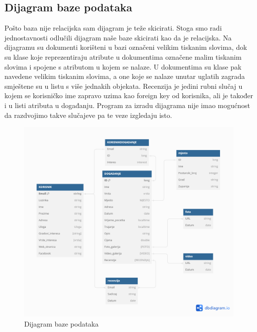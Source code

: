 			\subsection{Dijagram baze podataka}
				Pošto baza nije relacijska sam dijagram je teže skicirati. Stoga smo radi jednostavnosti odlučili dijagram naše baze skicirati kao da je relacijska. Na dijagramu su dokumenti korišteni u bazi označeni velikim tiskanim slovima, dok su klase koje reprezentiraju atribute u dokumentima označene malim tiskanim slovima i spojene s atributom u kojem se nalaze. U dokumentima su klase pak navedene velikim tiskanim slovima, a one koje se nalaze unutar uglatih zagrada smještene su u listu s više jednakih objekata. Recenzija je jedini rubni slučaj u kojem se korisničko ime zapravo uzima kao foreign key od korisnika, ali je također i u listi atributa u događanju. Program za izradu dijagrama nije imao mogućnost da razdvojimo takve slučajeve pa te veze izgledaju isto.
				
				
		\begin{figure}[H]
			\includegraphics[width=\textwidth]{slike/Dijagram_baza.PNG} %
			\caption{Dijagram baze podataka}
			\label{fig:promjene2} %
		\end{figure}
			\eject
			
